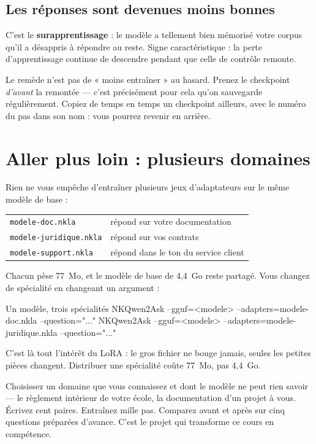 \subsection{Les réponses sont devenues moins bonnes}

C'est le \textbf{surapprentissage} : le modèle a tellement bien mémorisé votre
corpus qu'il a désappris à répondre au reste. Signe caractéristique : la perte
d'apprentissage continue de descendre pendant que celle de contrôle remonte.

\begin{nkpiege}
Le remède n'est pas de « moins entraîner » au hasard. Prenez le checkpoint
\emph{d'avant} la remontée — c'est précisément pour cela qu'on sauvegarde
régulièrement. Copiez de temps en temps un checkpoint ailleurs, avec le numéro
du pas dans son nom : vous pourrez revenir en arrière.
\end{nkpiege}

\section{Aller plus loin : plusieurs domaines}

Rien ne vous empêche d'entraîner plusieurs jeux d'adaptateurs sur le même modèle
de base :

\begin{center}
\begin{tabular}{ll}
\toprule
\texttt{modele-doc.nkla} & répond sur votre documentation \\
\texttt{modele-juridique.nkla} & répond sur vos contrats \\
\texttt{modele-support.nkla} & répond dans le ton du service client \\
\bottomrule
\end{tabular}
\end{center}

Chacun pèse 77~Mo, et le modèle de base de 4,4~Go reste partagé. Vous changez de
spécialité en changeant un argument :

\begin{nkcode}[]{Un modèle, trois spécialités}
NKQwen2Ask --gguf=<modele> --adapters=modele-doc.nkla       --question="..."
NKQwen2Ask --gguf=<modele> --adapters=modele-juridique.nkla --question="..."
\end{nkcode}

\begin{nkretenir}
C'est là tout l'intérêt du LoRA : le gros fichier ne bouge jamais, seules les
petites pièces changent. Distribuer une spécialité coûte 77~Mo, pas 4,4~Go.
\end{nkretenir}

\begin{nkexo}
Choisissez un domaine que vous connaissez et dont le modèle ne peut rien savoir
— le règlement intérieur de votre école, la documentation d'un projet à vous.
Écrivez cent paires. Entraînez mille pas. Comparez avant et après sur cinq
questions préparées d'avance. C'est le projet qui transforme ce cours en
compétence.
\end{nkexo}
